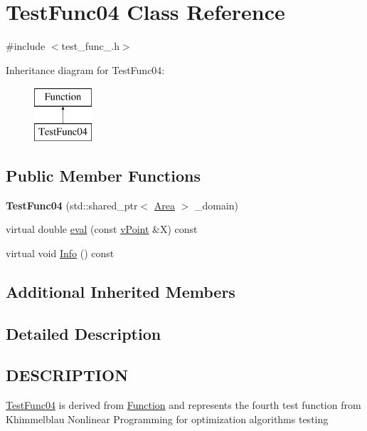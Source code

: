 \hypertarget{class_test_func04}{}\section{Test\+Func04 Class Reference}
\label{class_test_func04}


{\ttfamily \#include $<$test\+\_\+func\+\_.\+h$>$}

Inheritance diagram for Test\+Func04\+:\begin{figure}[H]
\begin{center}
\leavevmode
\includegraphics[height=2.000000cm]{class_test_func04}
\end{center}
\end{figure}
\subsection*{Public Member Functions}
\begin{DoxyCompactItemize}
\item 
\mbox{\label{class_test_func04_a39b17958a522cab5a7aa4043d716cae3}} 
{\bfseries Test\+Func04} (std\+::shared\+\_\+ptr$<$ \hyperlink{class_area}{Area} $>$ \+\_\+domain)
\item 
virtual double \hyperlink{class_test_func04_a8c4666904611a414b985d17661847ec7}{eval} (const \hyperlink{classv_point}{v\+Point} \&X) const
\item 
virtual void \hyperlink{class_test_func04_a7c2bf8c334c926cbfa464081e33ac30f}{Info} () const
\end{DoxyCompactItemize}
\subsection*{Additional Inherited Members}


\subsection{Detailed Description}
\hypertarget{function_8h_DESCRIPTION}{}\subsection{D\+E\+S\+C\+R\+I\+P\+T\+I\+ON}\label{function_8h_DESCRIPTION}
\hyperlink{class_test_func04}{Test\+Func04} is derived from \hyperlink{class_function}{Function} and represents the fourth test function from Khimmelblau \textquotesingle{}Nonlinear Programming\textquotesingle{} for optimization algorithms testing 

